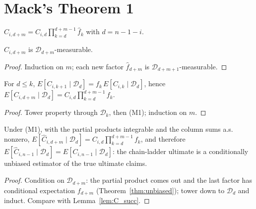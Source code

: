 \section{Mack's Theorem 1}

\begin{definition}\label{def:ChatRv}\leanok
{}
$\hat C_{i,d+m} = C_{i,d}\prod_{k=d}^{d+m-1}\hat f_k$ with $d = n-1-i$.
\end{definition}

\begin{lemma}\label{lem:ChatRv_meas}\leanok
{}
$\hat C_{i,d+m}$ is $\mathcal{D}_{d+m}$-measurable.
\end{lemma}
\begin{proof}\leanok Induction on $m$; each new factor $\hat f_{d+m}$ is $\mathcal{D}_{d+m+1}$-measurable. \end{proof}

\begin{lemma}[Iterating (M1)]\label{lem:C_succ}\leanok
{}
For $d \le k$, $E[C_{i,k+1} \mid \mathcal{D}_d] = f_k\,E[C_{i,k} \mid \mathcal{D}_d]$, hence
$E[C_{i,d+m} \mid \mathcal{D}_d] = C_{i,d}\prod_{k=d}^{d+m-1} f_k$.
\end{lemma}
\begin{proof}\leanok Tower property through $\mathcal{D}_k$, then (M1); induction on $m$. \end{proof}

\begin{theorem}\label{thm:mack1}\leanok
{}
Under (M1), with the partial products integrable and the column sums a.s. nonzero,
$E[\hat C_{i,d+m} \mid \mathcal{D}_d] = C_{i,d}\prod_{k=d}^{d+m-1} f_k$, and therefore
$E[\hat C_{i,n-1} \mid \mathcal{D}_d] = E[C_{i,n-1} \mid \mathcal{D}_d]$: the chain-ladder
ultimate is a conditionally unbiased estimator of the true ultimate claims.
\end{theorem}
\begin{proof}\leanok
Condition on $\mathcal{D}_{d+m}$: the partial product comes out and the last factor has
conditional expectation $f_{d+m}$ (Theorem~\ref{thm:unbiased}); tower down to $\mathcal{D}_d$
and induct. Compare with Lemma~\ref{lem:C_succ}.
\end{proof}

